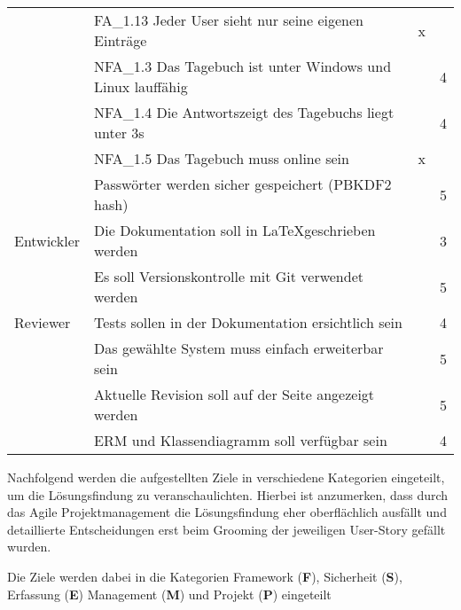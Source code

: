 \begin{longtable}{ p{2.2cm}|p{10cm}|c|c  }
    & FA\_1.13 Jeder User sieht nur seine eigenen Einträge & x & \\
    & NFA\_1.3 Das Tagebuch ist unter Windows und Linux lauffähig & & 4 \\
    & NFA\_1.4 Die Antwortszeigt des Tagebuchs liegt unter 3s & & 4 \\
    & NFA\_1.5 Das Tagebuch muss online sein & x & \\
    & Passwörter werden sicher gespeichert (PBKDF2 hash) & & 5 \\
    Entwickler & Die Dokumentation soll in \LaTeX geschrieben werden & & 3 \\
    & Es soll Versionskontrolle mit Git verwendet werden & & 5 \\
    Reviewer & Tests sollen in der Dokumentation ersichtlich sein & & 4 \\
    & Das gewählte System muss einfach erweiterbar sein & & 5 \\
    & Aktuelle Revision soll auf der Seite angezeigt werden & & 5 \\
    & ERM und Klassendiagramm soll verfügbar sein & & 4 \\
\end{longtable}

\noindent
Nachfolgend werden die aufgestellten Ziele in verschiedene Kategorien eingeteilt, um die Lösungsfindung zu veranschaulichten. Hierbei ist anzumerken, dass durch das Agile Projektmanagement die Lösungsfindung eher oberflächlich ausfällt und detaillierte Entscheidungen erst beim Grooming der jeweiligen User-Story gefällt wurden.

Die Ziele werden dabei in die Kategorien Framework (\textbf{F}), Sicherheit (\textbf{S}), Erfassung (\textbf{E}) Management (\textbf{M}) und Projekt (\textbf{P}) eingeteilt

